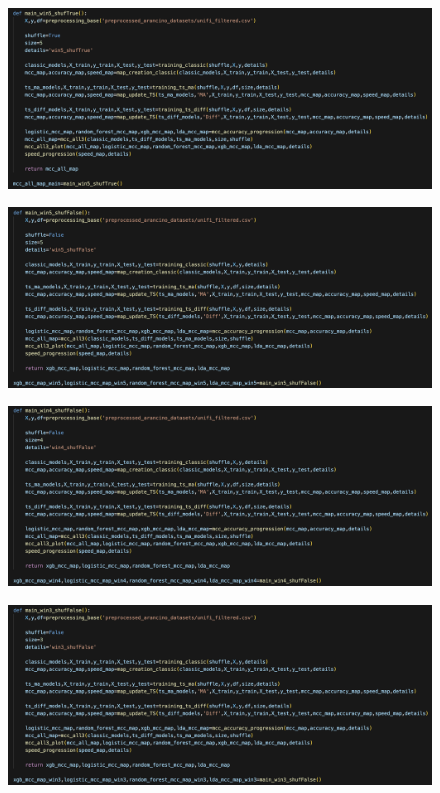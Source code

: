 \begin{appendices}
\begin{figure}[H]
    \centering
    \includegraphics[width=1\linewidth]{25.png}
    \label{fig:enter-label}
\end{figure}

\begin{figure}[H]
    \centering
    \includegraphics[width=1\linewidth]{26.png}
    \label{fig:enter-label}
\end{figure}

\begin{figure}[H]
    \centering
    \includegraphics[width=1\linewidth]{27.png}
    \label{fig:enter-label}
\end{figure}

\begin{figure}[H]
    \centering
    \includegraphics[width=1\linewidth]{28.png}
    \label{fig:enter-label}
\end{figure}


\end{appendices}
